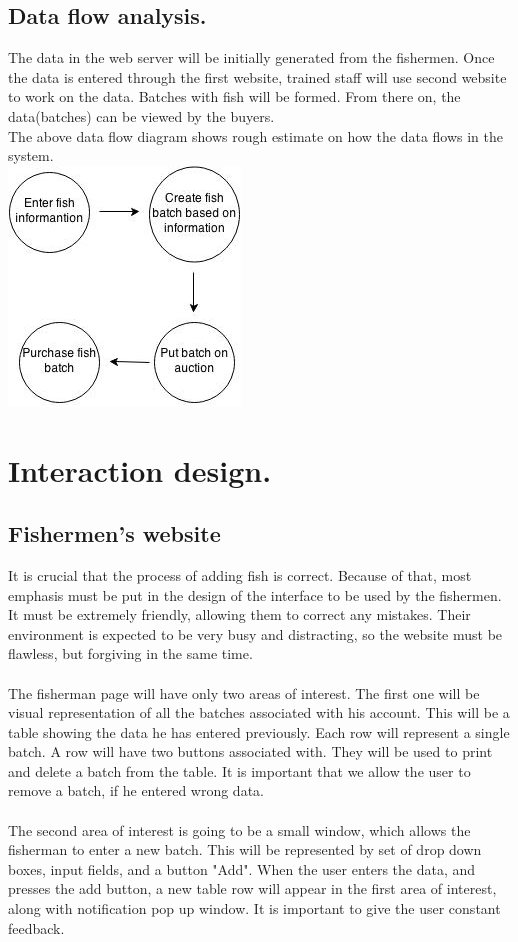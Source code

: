 \documentclass[a4paper]{article}
\begin{document}
\subsection{Data flow analysis.}
The data in the web server will be initially generated from the fishermen. Once the data is entered through the first website, trained staff will use second website to work on the data. Batches with fish will be formed. From there on, the data(batches) can be viewed by the buyers.\\ 
The above data flow diagram shows rough estimate on how the data flows in the system.\\
\includegraphics[scale=1]{dataflow.jpg}

\section{Interaction design.}
\subsection{Fishermen's website}
It is crucial that the process of adding fish is correct. Because of that, most emphasis must be put in the design of the interface to be used by the fishermen. It must be extremely friendly, allowing them to correct any mistakes. Their environment is expected to be very busy and distracting, so the website must be flawless, but forgiving in the same time.\\\\
The fisherman page will have only two areas of interest. The first one will be visual representation of all the batches associated with his account. This will be a table showing the data he has entered previously. Each row will represent a single batch. A row will have two buttons associated with. They will be used to print and delete a batch from the table. It is important that we allow the user to remove a batch, if he entered wrong data.\\\\
The second area of interest is going to be a small window, which allows the fisherman to enter a new batch. This will be represented by set of drop down boxes, input fields, and a button "Add". When the user enters the data, and presses the add button, a new table row will appear in the first area of interest, along with notification pop up window. It is important to give the user constant feedback.
\end{document}
